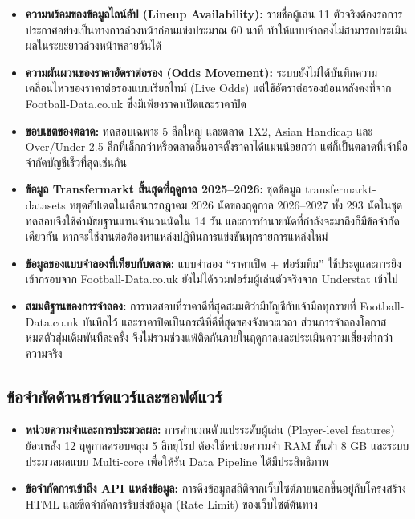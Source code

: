 \begin{itemize}
    \item \textbf{ความพร้อมของข้อมูลไลน์อัป (Lineup Availability):} รายชื่อผู้เล่น 11 ตัวจริงต้องรอการประกาศอย่างเป็นทางการล่วงหน้าก่อนแข่งประมาณ 60 นาที ทำให้แบบจำลองไม่สามารถประเมินผลในระยะยาวล่วงหน้าหลายวันได้
    \item \textbf{ความผันผวนของราคาอัตราต่อรอง (Odds Movement):} ระบบยังไม่ได้บันทึกความเคลื่อนไหวของราคาต่อรองแบบเรียลไทม์ (Live Odds) แต่ใช้อัตราต่อรองย้อนหลังคงที่จาก Football-Data.co.uk ซึ่งมีเพียงราคาเปิดและราคาปิด
    \item \textbf{ขอบเขตของตลาด:} ทดสอบเฉพาะ 5 ลีกใหญ่ และตลาด 1X2, Asian Handicap และ Over/Under 2.5 ลีกที่เล็กกว่าหรือตลาดอื่นอาจตั้งราคาได้แม่นน้อยกว่า แต่ก็เป็นตลาดที่เจ้ามือจำกัดบัญชีเร็วที่สุดเช่นกัน
    \item \textbf{ข้อมูล Transfermarkt สิ้นสุดที่ฤดูกาล 2025--2026:} ชุดข้อมูล transfermarkt-datasets หยุดอัปเดตในเดือนกรกฎาคม 2026 นัดของฤดูกาล 2026--2027 ทั้ง 293 นัดในชุดทดสอบจึงใช้ค่ามัธยฐานแทนจำนวนนัดใน 14 วัน และการทำนายนัดที่กำลังจะมาถึงก็มีข้อจำกัดเดียวกัน หากจะใช้งานต่อต้องหาแหล่งปฏิทินการแข่งขันทุกรายการแหล่งใหม่
    \item \textbf{ข้อมูลของแบบจำลองที่เทียบกับตลาด:} แบบจำลอง ``ราคาเปิด + ฟอร์มทีม'' ใช้ประตูและการยิงเข้ากรอบจาก Football-Data.co.uk ยังไม่ได้รวมฟอร์มผู้เล่นตัวจริงจาก Understat เข้าไป
    \item \textbf{สมมติฐานของการจำลอง:} การทดสอบที่ราคาดีที่สุดสมมติว่ามีบัญชีกับเจ้ามือทุกรายที่ Football-Data.co.uk บันทึกไว้ และราคาปิดเป็นกรณีที่ดีที่สุดของจังหวะเวลา ส่วนการจำลองโอกาสหมดตัวสุ่มเดิมพันทีละครั้ง จึงไม่รวมช่วงแพ้ติดกันภายในฤดูกาลและประเมินความเสี่ยงต่ำกว่าความจริง
\end{itemize}

\subsection{ข้อจำกัดด้านฮาร์ดแวร์และซอฟต์แวร์}

\begin{itemize}
    \item \textbf{หน่วยความจำและการประมวลผล:} การคำนวณตัวแปรระดับผู้เล่น (Player-level features) ย้อนหลัง 12 ฤดูกาลครอบคลุม 5 ลีกยุโรป ต้องใช้หน่วยความจำ RAM ขั้นต่ำ 8 GB และระบบประมวลผลแบบ Multi-core เพื่อให้รัน Data Pipeline ได้มีประสิทธิภาพ
    \item \textbf{ข้อจำกัดการเข้าถึง API แหล่งข้อมูล:} การดึงข้อมูลสถิติจากเว็บไซต์ภายนอกขึ้นอยู่กับโครงสร้าง HTML และขีดจำกัดการรับส่งข้อมูล (Rate Limit) ของเว็บไซต์ต้นทาง
\end{itemize}

